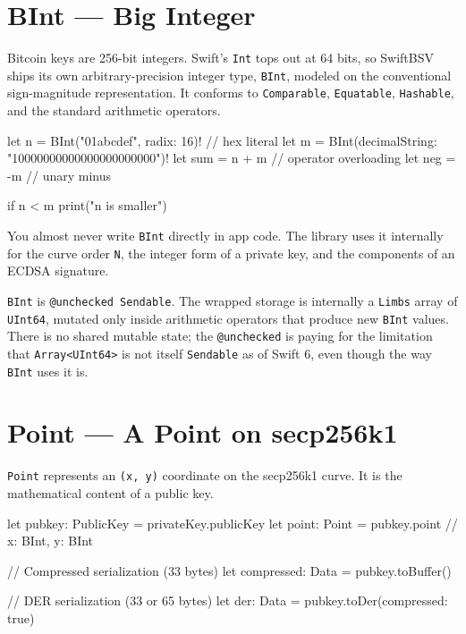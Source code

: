 \documentclass[a4paper, 11pt, openany]{book}
\begin{document}
\section{BInt --- Big Integer}

Bitcoin keys are 256-bit integers. Swift's \texttt{Int} tops out at 64 bits, so SwiftBSV ships its own arbitrary-precision integer type, \texttt{BInt}, modeled on the conventional sign-magnitude representation. It conforms to \texttt{Comparable}, \texttt{Equatable}, \texttt{Hashable}, and the standard arithmetic operators.

\begin{forthbox}
let n = BInt("01abcdef", radix: 16)!     // hex literal
let m = BInt(decimalString: "10000000000000000000000")!
let sum = n + m                           // operator overloading
let neg = -m                              // unary minus

if n < m { print("n is smaller") }
\end{forthbox}

You almost never write \texttt{BInt} directly in app code. The library uses it internally for the curve order \texttt{N}, the integer form of a private key, and the components of an ECDSA signature.

\begin{notebox}
\texttt{BInt} is \texttt{@unchecked Sendable}. The wrapped storage is internally a \texttt{Limbs} array of \texttt{UInt64}, mutated only inside arithmetic operators that produce new \texttt{BInt} values. There is no shared mutable state; the \texttt{@unchecked} is paying for the limitation that \texttt{Array<UInt64>} is not itself \texttt{Sendable} as of Swift 6, even though the way \texttt{BInt} uses it is.
\end{notebox}

\section{Point --- A Point on secp256k1}

\texttt{Point} represents an \texttt{(x, y)} coordinate on the secp256k1 curve. It is the mathematical content of a public key.

\begin{forthbox}
let pubkey: PublicKey = privateKey.publicKey
let point: Point = pubkey.point        // x: BInt, y: BInt

// Compressed serialization (33 bytes)
let compressed: Data = pubkey.toBuffer()

// DER serialization (33 or 65 bytes)
let der: Data = pubkey.toDer(compressed: true)
\end{forthbox}
\end{document}
